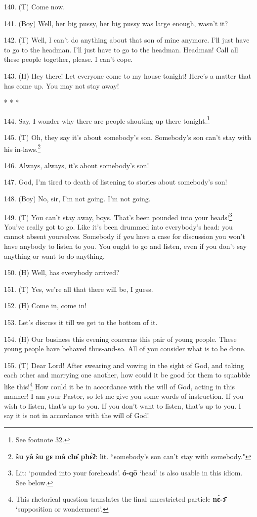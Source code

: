 
140. (T) Come now.

141. (Boy) Well, her big pussy, her big pussy was large enough, wasn't it?

142. (T) Well, I can't do anything about that son of mine anymore. I'll just have
to go to the headman. I'll just have to go to the headman. Headman! Call all these
people together, please. I can't cope.

143. (H) Hey there! Let everyone come to my house tonight! Here's a matter that
has come up. You may not stay away!

\begin{center}
* * *
\end{center}

144. Say, I wonder why there are people shouting up there tonight.\footnote{See footnote 32.}

145. (T)  Oh, they say it's
about somebody's son. Somebody's son can't stay with his in-laws.\footnote{\textbf{šu} \textbf{yâ} \textbf{šu} \textbf{gɛ} \textbf{mâ} \textbf{chɛ̂} \textbf{phɛ̀ʔ}: lit. ``somebody's son can't stay with somebody."}

146. Always, always, it's about somebody's son!

147. God, I'm tired to death of listening to stories about somebody's son!

148. (Boy) No, sir, I'm not going. I'm not going.

149. (T) You can't stay away, boys. That's been pounded into your heads!\footnote{Lit: `pounded into your foreheads'. \textbf{ó-qō} `head' is also usable in this idiom. See below.} You've
really got to go. Like it's been drummed into everybody's head: you cannot absent
yourselves. Somebody if \textit{you} have a case for discussion you won't have
anybody to listen to you. You ought to go and listen, even if you don't say anything
or want to do anything.

150. (H) Well, has everybody arrived?

151. (T) Yes, we're all that there will be, I guess.

152. (H) Come in, come in!

153. Let's discuss it till we get to the bottom of it.

154. (H) Our business this evening concerns this pair of young people. These young
people have behaved thus-and-so. All of you consider what is to be done.

155. (T)  Dear Lord! After swearing and vowing
in the sight of God, and taking each other and marrying one another, how could
it be good for them to squabble like this!\footnote{This rhetorical question translates the final unrestricted particle \textbf{nɛ̀-ɔ̄} `supposition or wonderment'.} How could it be in accordance with
the will of God, acting in this manner! I am your Pastor, so let me give you some
words of instruction. If you wish to listen, that's up to you. If you don't want
to listen, that's up to you. I say it is not in accordance with the will of God!


